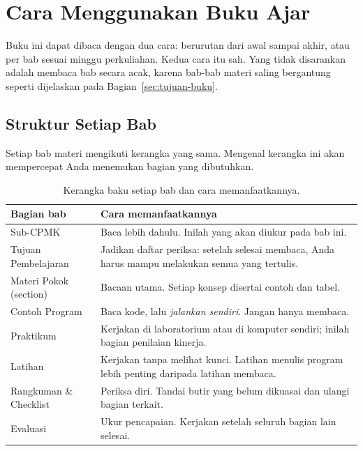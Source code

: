 \section{Cara Menggunakan Buku Ajar}
\label{sec:cara-menggunakan}

Buku ini dapat dibaca dengan dua cara: berurutan dari awal sampai
akhir, atau per bab sesuai minggu perkuliahan. Kedua cara itu sah.
Yang tidak disarankan adalah membaca bab secara acak, karena bab-bab
materi saling bergantung seperti dijelaskan pada
Bagian~\ref{sec:tujuan-buku}.

\subsection{Struktur Setiap Bab}

Setiap bab materi mengikuti kerangka yang sama. Mengenal kerangka ini
akan mempercepat Anda menemukan bagian yang dibutuhkan.

\begin{table}[H]
    \centering
    \caption{Kerangka baku setiap bab dan cara memanfaatkannya.}
    \label{tab:kerangka-bab}
    \small
    \begin{tabular}{@{}p{3.8cm}p{9.6cm}@{}}
        \toprule
        \textbf{Bagian bab} & \textbf{Cara memanfaatkannya} \\
        \midrule
        Sub-CPMK & Baca lebih dahulu. Inilah yang akan diukur pada
        bab ini. \\
        \addlinespace
        Tujuan Pembelajaran & Jadikan daftar periksa: setelah selesai
        membaca, Anda harus mampu melakukan semua yang tertulis. \\
        \addlinespace
        Materi Pokok (section) & Bacaan utama. Setiap konsep disertai
        contoh dan tabel. \\
        \addlinespace
        Contoh Program & Baca kode, lalu \emph{jalankan sendiri}.
        Jangan hanya membaca. \\
        \addlinespace
        Praktikum & Kerjakan di laboratorium atau di komputer
        sendiri; inilah bagian penilaian kinerja. \\
        \addlinespace
        Latihan & Kerjakan tanpa melihat kunci. Latihan menulis
        program lebih penting daripada latihan membaca. \\
        \addlinespace
        Rangkuman \& Checklist & Periksa diri. Tandai butir yang belum
        dikuasai dan ulangi bagian terkait. \\
        \addlinespace
        Evaluasi & Ukur pencapaian. Kerjakan setelah seluruh bagian
        lain selesai. \\
        \bottomrule
    \end{tabular}
\end{table}

